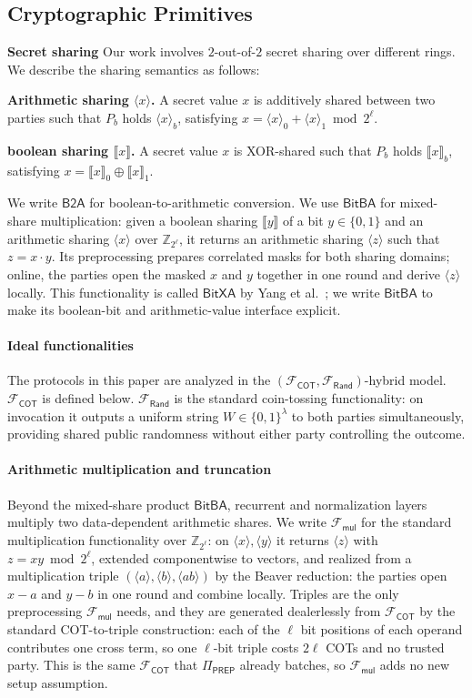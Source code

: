\documentclass[journal]{IEEEtran}
\theoremstyle{definition}
\theoremstyle{plain}
\newcommand{\Z}{\mathbb{Z}}
\newcommand{\ashare}[1]{\langle #1 \rangle}             %
\newcommand{\bshare}[1]{\llbracket #1 \rrbracket}        %
\newcommand{\Fcot}{\mathcal{F}_{\mathsf{COT}}}
\newcommand{\Frand}{\mathcal{F}_{\mathsf{Rand}}}
\newcommand{\Fmul}{\mathcal{F}_{\mathsf{mul}}}
\newcommand{\BitBA}{\mathsf{BitBA}}
\newcommand{\PREP}{\Pi_{\mathsf{PREP}}}
\begin{document}
\subsection{Cryptographic Primitives}
\textbf{Secret sharing}
Our work involves $2$-out-of-$2$ secret sharing over different rings. We describe the sharing semantics as follows:

\noindent\textbf{Arithmetic sharing $\ashare{x}$.} A secret value $x$ is additively shared between two parties such that $P_b$ holds $\ashare{x}_b$, satisfying $x=\ashare{x}_0+\ashare{x}_1 \bmod 2^{\ell}$.

\noindent\textbf{boolean sharing $\bshare{x}$.} A secret value $x$ is XOR-shared such that $P_b$ holds $\bshare{x}_b$, satisfying $x=\bshare{x}_0\oplus\bshare{x}_1$.

We write
$\mathsf{B2A}$ for boolean-to-arithmetic conversion. We use $\BitBA$ for
mixed-share multiplication: given a boolean sharing $\bshare{y}$ of a bit
$y\in\{0,1\}$ and an arithmetic sharing $\ashare{x}$ over $\Z_{2^\ell}$, it
returns an arithmetic sharing $\ashare{z}$ such that $z=x\cdot y$. Its
preprocessing prepares correlated masks for both sharing domains; online, the
parties open the masked $x$ and $y$ together in one round and derive
$\ashare{z}$ locally. This functionality is called $\mathsf{BitXA}$ by
Yang et al.~\cite{fssnn}; we write $\BitBA$ to make its boolean-bit and
arithmetic-value interface explicit.

\paragraph*{Ideal functionalities}
The protocols in this paper are analyzed in the $(\Fcot,\Frand)$-hybrid
model. $\Fcot$ is defined below. $\Frand$ is the standard coin-tossing
functionality: on invocation it outputs a uniform string $W\in\{0,1\}^{\lambda}$ to
both parties simultaneously, providing shared public randomness without either party
controlling the outcome.

\paragraph*{Arithmetic multiplication and truncation}
Beyond the mixed-share product $\BitBA$, recurrent and normalization layers
multiply two data-dependent arithmetic shares. We write $\Fmul$ for the
standard multiplication functionality over $\Z_{2^{\ell}}$: on
$\ashare{x},\ashare{y}$ it returns $\ashare{z}$ with $z=xy\bmod 2^{\ell}$,
extended componentwise to vectors, and realized from a multiplication triple
$(\ashare{a},\ashare{b},\ashare{ab})$ by the Beaver reduction: the parties
open $x-a$ and $y-b$ in one round and combine locally. Triples are the only
preprocessing $\Fmul$ needs, and they are generated dealerlessly from $\Fcot$
by the standard COT-to-triple construction: each of the $\ell$ bit positions of
each operand contributes one cross term, so one $\ell$-bit triple costs
$2\ell$ COTs and no trusted party. This is the same $\Fcot$ that $\PREP$
already batches, so $\Fmul$ adds no new setup assumption.
\end{document}
